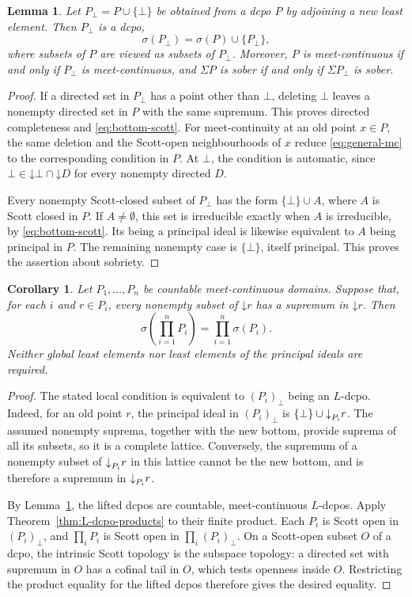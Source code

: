 \documentclass[11pt,reqno]{amsart}
\newtheorem{lemma}[theorem]{Lemma}
\newtheorem{corollary}[theorem]{Corollary}
\theoremstyle{definition}
\theoremstyle{remark}
\numberwithin{equation}{section}
\newcommand{\down}[1]{\mathord{\downarrow}#1}
\newcommand{\Sc}{\sigma}
\newcommand{\Sig}{\Sigma}
\begin{document}
\begin{lemma}\label{lem:adjoin-bottom}
Let $P_\bot=P\cup\{\bot\}$ be obtained from a dcpo $P$ by adjoining a new least element. Then $P_\bot$ is a dcpo,
\begin{equation}\label{eq:bottom-scott}
 \Sc(P_\bot)=\Sc(P)\cup\{P_\bot\},
\end{equation}
where subsets of $P$ are viewed as subsets of $P_\bot$. Moreover, $P$ is meet-continuous if and only if $P_\bot$ is meet-continuous, and $\Sig P$ is sober if and only if $\Sig P_\bot$ is sober.
\end{lemma}
\begin{proof}
If a directed set in $P_\bot$ has a point other than $\bot$, deleting $\bot$ leaves a nonempty directed set in $P$ with the same supremum. This proves directed completeness and \eqref{eq:bottom-scott}. For meet-continuity at an old point $x\in P$, the same deletion and the Scott-open neighbourhoods of $x$ reduce \eqref{eq:general-mc} to the corresponding condition in $P$. At $\bot$, the condition is automatic, since $\bot\in\down\bot\cap\down D$ for every nonempty directed $D$.

Every nonempty Scott-closed subset of $P_\bot$ has the form $\{\bot\}\cup A$, where $A$ is Scott closed in $P$. If $A\ne\emptyset$, this set is irreducible exactly when $A$ is irreducible, by \eqref{eq:bottom-scott}. Its being a principal ideal is likewise equivalent to $A$ being principal in $P$. The remaining nonempty case is $\{\bot\}$, itself principal. This proves the assertion about sobriety.
\end{proof}

\begin{corollary}\label{cor:bottom-free-local-products}
Let $P_1,\ldots,P_n$ be countable meet-continuous domains. Suppose that, for each $i$ and $r\in P_i$, every nonempty subset of $\down r$ has a supremum in $\down r$. Then
\[
 \Sc\!\left(\prod_{i=1}^{n}P_i\right)
 =\prod_{i=1}^{n}\Sc(P_i).
\]
Neither global least elements nor least elements of the principal ideals are required.
\end{corollary}
\begin{proof}
The stated local condition is equivalent to $(P_i)_\bot$ being an $L$-dcpo. Indeed, for an old point $r$, the principal ideal in $(P_i)_\bot$ is $\{\bot\}\cup\down_{P_i}r$. The assumed nonempty suprema, together with the new bottom, provide suprema of all its subsets, so it is a complete lattice. Conversely, the supremum of a nonempty subset of $\down_{P_i}r$ in this lattice cannot be the new bottom, and is therefore a supremum in $\down_{P_i}r$.

By Lemma~\ref{lem:adjoin-bottom}, the lifted dcpos are countable, meet-continuous $L$-dcpos. Apply Theorem~\ref{thm:L-dcpo-products} to their finite product. Each $P_i$ is Scott open in $(P_i)_\bot$, and $\prod_iP_i$ is Scott open in $\prod_i(P_i)_\bot$. On a Scott-open subset $O$ of a dcpo, the intrinsic Scott topology is the subspace topology: a directed set with supremum in $O$ has a cofinal tail in $O$, which tests openness inside $O$. Restricting the product equality for the lifted dcpos therefore gives the desired equality.
\end{proof}
\end{document}

